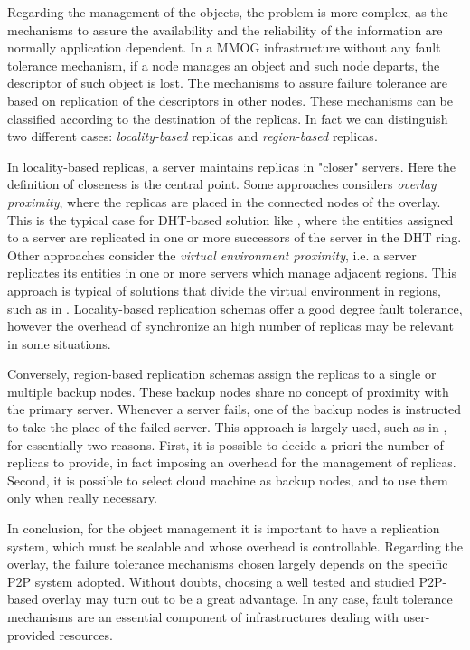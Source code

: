 \documentclass[final,10pt,a5paper]{phdimt}
\theoremstyle{definition}
\begin{document}
Regarding the management of the objects, the problem is more complex, as the mechanisms to assure the availability and the reliability of the information are normally application dependent.
In a MMOG infrastructure without any fault tolerance mechanism, if a node manages an object and such node departs, the descriptor of such object is lost. 
The mechanisms to assure failure tolerance are based on replication of the descriptors in other nodes. These mechanisms can be classified according to the destination of the replicas. In fact we can distinguish two different cases: \textit{locality-based} replicas and \textit{region-based} replicas. 


In locality-based replicas, a server maintains replicas in "closer" servers. Here the definition of closeness is the central point.  
Some approaches considers \textit{overlay proximity}, where the replicas are placed in the connected nodes of the overlay. This is the typical case for DHT-based solution like \cite{Knutsson2004,holzapfel2011vorostore}, where the entities assigned to a server are replicated in one or more successors of the server in the DHT ring. Other approaches consider the \textit{virtual environment proximity}, i.e. a server replicates its entities in one or more servers which manage adjacent regions. This approach is typical of solutions that divide the virtual environment in regions, such as in \cite{Frey2008}.
Locality-based replication schemas offer a good degree fault tolerance, however the overhead of synchronize an high number of replicas may be relevant in some situations.


Conversely, region-based replication schemas assign the replicas to a single or multiple backup nodes. These backup nodes share no concept of proximity with the primary server. Whenever a server fails, one of the backup nodes is instructed to take the place of the failed server.  This approach is largely used, such as in \cite{hu2008voronoi,Chen,Kim2004}, for essentially two reasons.
First, it is possible to decide a priori the number of replicas to provide, in fact imposing an overhead for the management of replicas.
Second, it is possible to select cloud machine as backup nodes, and to use them only when really necessary. 



In conclusion, for the object management it is important to have a replication system, which must be scalable and whose overhead is controllable. Regarding the overlay, the failure tolerance mechanisms chosen largely depends on the specific P2P system adopted. Without doubts, choosing a well tested and studied P2P-based overlay may turn out to be a great advantage. In any case, fault tolerance mechanisms are an essential component of infrastructures dealing with user-provided resources.
\end{document}
